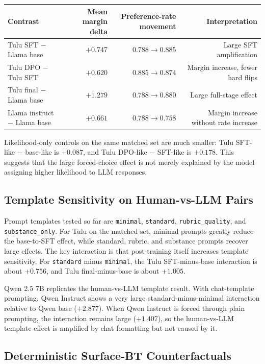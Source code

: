 \documentclass[11pt]{article}
\begin{document}
\begin{center}
\small
\begin{tabular}{lrrr}
\toprule
Contrast & Mean margin delta & Preference-rate movement & Interpretation \\
\midrule
Tulu SFT $-$ Llama base & $+0.747$ & $0.788 \to 0.885$ & Large SFT amplification \\
Tulu DPO $-$ Tulu SFT & $+0.620$ & $0.885 \to 0.874$ & Margin increase, fewer hard flips \\
Tulu final $-$ Llama base & $+1.279$ & $0.788 \to 0.880$ & Large full-stage effect \\
Llama instruct $-$ Llama base & $+0.661$ & $0.788 \to 0.758$ & Margin increase without rate increase \\
\bottomrule
\end{tabular}
\end{center}

Likelihood-only controls on the same matched set are much smaller:
Tulu SFT-like $-$ base-like is $+0.087$, and Tulu DPO-like $-$ SFT-like is
$+0.178$. This suggests that the large forced-choice effect is not merely
explained by the model assigning higher likelihood to LLM responses.

\subsection{Template Sensitivity on Human-vs-LLM Pairs}

Prompt templates tested so far are \texttt{minimal}, \texttt{standard},
\texttt{rubric\_quality}, and \texttt{substance\_only}. For Tulu on the matched
set, minimal prompts greatly reduce the base-to-SFT effect, while standard,
rubric, and substance prompts recover large effects. The key interaction is
that post-training itself increases template sensitivity. For
\texttt{standard} minus \texttt{minimal}, the Tulu SFT-minus-base interaction
is about $+0.756$, and Tulu final-minus-base is about $+1.005$.

Qwen 2.5 7B replicates the human-vs-LLM template result. With chat-template
prompting, Qwen Instruct shows a very large standard-minus-minimal interaction
relative to Qwen base ($+2.877$). When Qwen Instruct is forced through plain
prompting, the interaction remains large ($+1.407$), so the human-vs-LLM
template effect is amplified by chat formatting but not caused by it.

\subsection{Deterministic Surface-BT Counterfactuals}
\end{document}
